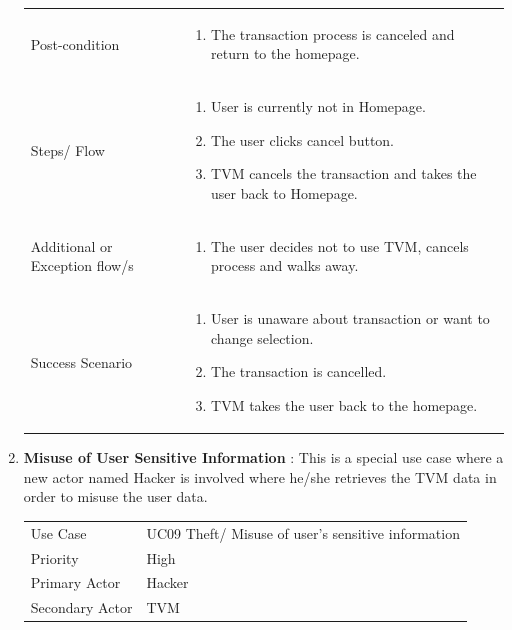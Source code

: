 \documentclass[15pt]{article}
\begin{document}
\begin{enumerate}[leftmargin=2em, itemsep=0pt, parsep=0pt, , font=\Large\bfseries]
\begin{tabularx}{1\textwidth} { 
  | >{\raggedright\arraybackslash}X 
  | >{\raggedright\arraybackslash}X 
  | }
   Post-condition  & \begin{enumerate}
  \item The transaction process is canceled and return to the homepage.
  \end{enumerate}
  \\
  
  Steps/ Flow  & \begin{enumerate}
  \item User is currently not in Homepage.
  \item The user clicks cancel button.
  \item TVM cancels the transaction and takes the user back to Homepage.
  \end{enumerate}
  \\
  
   Additional or Exception flow/s  & \begin{enumerate}
  \item  The user decides not to use TVM, cancels process and walks away.
  \end{enumerate}
  \\
    
   Success Scenario  & \begin{enumerate}
  \item  User is unaware about transaction or want to change selection.
  \item The transaction is cancelled.
  \item TVM takes the user back to the homepage.
  \end{enumerate}
  \\

\hline
\end{tabularx}


\newpage
\item {\Large\bfseries{Misuse of User Sensitive Information}} : This is a special use case where a new actor named Hacker is involved where he/she retrieves the TVM data in order to misuse the user data.
\newline
\newline
\begin{tabularx}{1\textwidth} { 
  | >{\raggedright\arraybackslash}X 
  | >{\raggedright\arraybackslash}X 
  | }
 \hline
 Use Case & UC09 Theft/ Misuse of user’s sensitive information \\
 Priority & High \\
 Primary Actor  & Hacker \\
 Secondary Actor  & TVM \\


\end{tabularx}
\end{enumerate}
\end{document}
